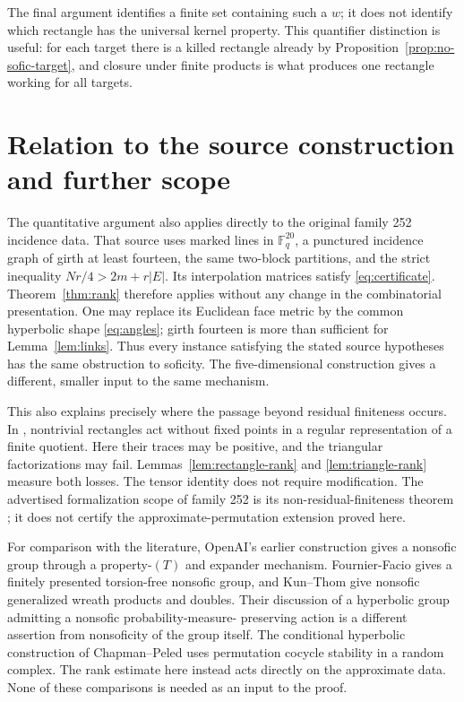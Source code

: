 \documentclass[11pt]{amsart}
\theoremstyle{definition}
\theoremstyle{remark}
\numberwithin{equation}{section}
\newcommand{\F}{\mathbb F}
\begin{document}
The final argument identifies a finite set containing such a $w$;
it does not identify which rectangle has the universal kernel
property. This quantifier distinction is useful: for each target
there is a killed rectangle already by
Proposition~\ref{prop:no-sofic-target}, and closure under finite
products is what produces one rectangle working for all targets.

\section{Relation to the source construction and further scope}\label{sec:discussion}

The quantitative argument also applies directly to the original
family 252 incidence data. That source uses marked lines in
$\F_q^{20}$, a punctured incidence graph of girth at least fourteen,
the same two-block partitions, and the strict inequality
$Nr/4>2m+r|E|$. Its interpolation matrices satisfy
\eqref{eq:certificate}. Theorem~\ref{thm:rank} therefore applies
without any change in the combinatorial presentation. One may
replace its Euclidean face metric by the common hyperbolic shape
\eqref{eq:angles}; girth fourteen is more than sufficient for
Lemma~\ref{lem:links}. Thus every instance satisfying the stated
source hypotheses has the same obstruction to soficity. The
five-dimensional construction gives a different, smaller input to
the same mechanism.

This also explains precisely where the passage beyond residual
finiteness occurs. In \cite{OA252}, nontrivial rectangles act without
fixed points in a regular representation of a finite quotient.
Here their traces may be positive, and the triangular factorizations
may fail. Lemmas~\ref{lem:rectangle-rank} and
\ref{lem:triangle-rank} measure both losses. The tensor identity
does not require modification. The advertised formalization scope
of family 252 is its non-residual-finiteness theorem
\cite{OA252formal}; it does not certify the approximate-permutation
extension proved here.

For comparison with the literature, OpenAI's earlier construction
\cite[Chapter~3]{OA197} gives a nonsofic group through a
property-$(T)$ and expander mechanism. Fournier-Facio
\cite[Theorem~1.3]{FF} gives a finitely presented torsion-free
nonsofic group, and Kun--Thom \cite[Theorem~A]{KT} give
nonsofic generalized wreath products and doubles. Their discussion
of a hyperbolic group admitting a nonsofic probability-measure-
preserving action is a different assertion from nonsoficity of the
group itself. The conditional hyperbolic construction of
Chapman--Peled \cite{CP} uses permutation cocycle stability in a
random complex. The rank estimate here instead acts directly on
the approximate data. None of these comparisons is needed as an
input to the proof.
\end{document}
